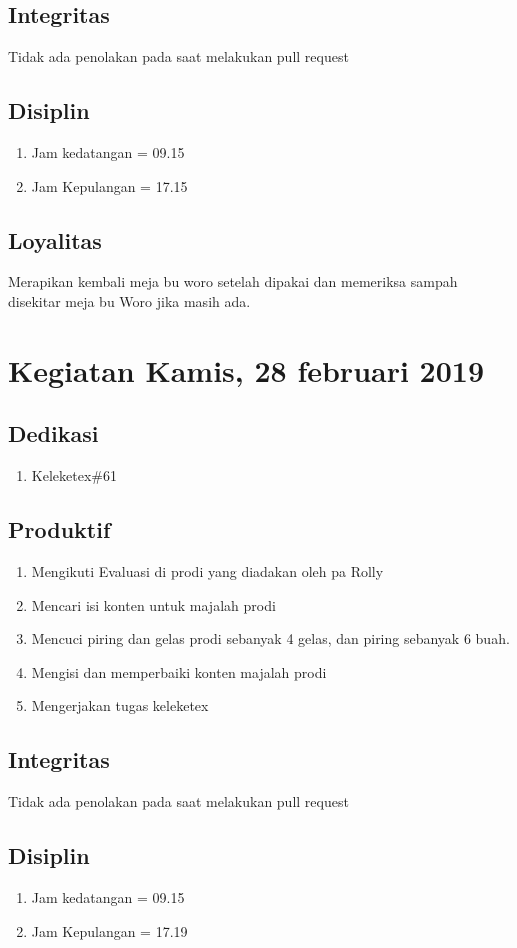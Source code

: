 \subsection{Integritas}
Tidak ada penolakan pada saat melakukan pull request
\subsection{Disiplin}
\begin{enumerate}
\item Jam kedatangan = 09.15
\item Jam Kepulangan = 17.15
\end{enumerate}
\subsection{Loyalitas}
Merapikan kembali meja bu woro setelah dipakai dan memeriksa sampah disekitar meja bu Woro jika masih ada.

\section{Kegiatan Kamis, 28 februari 2019}
\subsection{Dedikasi}
\begin{enumerate}
\item Keleketex\#61
\end{enumerate}
\subsection{Produktif}
\begin{enumerate}
\item Mengikuti Evaluasi di prodi yang diadakan oleh pa Rolly
\item Mencari isi konten untuk majalah prodi
\item Mencuci piring dan gelas prodi sebanyak 4 gelas, dan piring sebanyak 6 buah. 
\item Mengisi dan memperbaiki konten majalah prodi
\item Mengerjakan tugas keleketex
\end {enumerate}
\subsection{Integritas}
Tidak ada penolakan pada saat melakukan pull request
\subsection{Disiplin}
\begin{enumerate}
\item Jam kedatangan = 09.15
\item Jam Kepulangan = 17.19
\end{enumerate}
